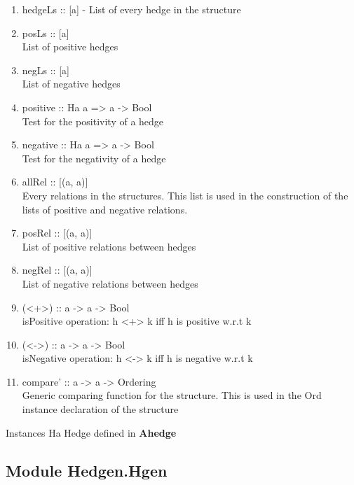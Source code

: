 \documentclass[../gr-final.tex]{subfiles}
\begin{document}
\begin{enumerate}
        \item hedgeLs :: [a] - List of every hedge in the structure

        \item posLs :: [a]\\
        List of positive hedges

        \item negLs :: [a]\\
           List of negative hedges

        \item  positive :: Ha a => a -> Bool\\
           Test for the positivity of a hedge

        \item  negative :: Ha a => a -> Bool\\
          Test for the negativity of a hedge

        \item  allRel :: [(a, a)]\\
          Every relations in the structures. This list is used in the
          construction of the lists of positive and negative relations.
        \item  posRel :: [(a, a)]\\
          List of positive relations between hedges

        \item  negRel :: [(a, a)]\\
          List of negative relations between hedges

        \item  (<+>) :: a -> a -> Bool\\
          isPositive operation: h <+> k iff h is positive w.r.t k
        \item  (<->) :: a -> a -> Bool\\
          isNegative operation: h <-> k iff h is negative w.r.t k
        \item  compare' :: a -> a -> Ordering\\
          Generic comparing function for the structure. This is used in
          the Ord instance declaration of the structure
\end{enumerate}
Instances Ha Hedge defined in {\bfseries Ahedge}

\subsection{Module Hedgen.Hgen}
\end{document}
